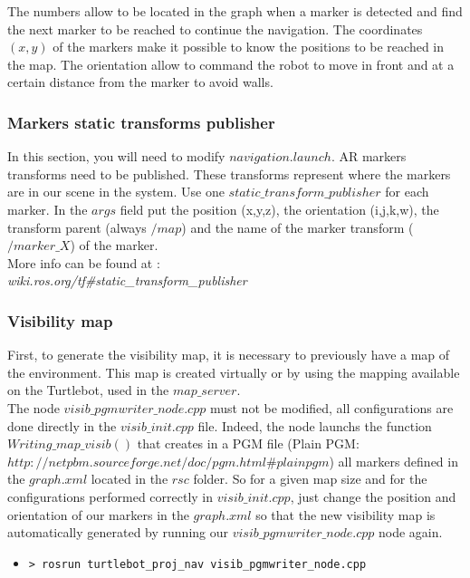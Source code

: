 \documentclass[10pt,a4paper]{article}
\begin{document}
The numbers allow to be located in the graph when a marker is detected and find the next marker to be reached to continue the navigation. The coordinates $(x,y)$ of the markers make it possible to know the positions to be reached in the map. The orientation allow to command the robot to move in front and at a certain distance from the marker to avoid walls.

\subsubsection{Markers static transforms publisher}

In this section, you will need to modify $navigation.launch$.
AR markers transforms need to be published. These transforms represent where the markers are in our scene in the system. Use one $static\_transform\_publisher$ for each marker. In the $args$ field put the position (x,y,z), the orientation (i,j,k,w), the transform parent (always $/map$) and the name of the marker transform ($/marker\_X$) of the marker.
\\More info can be found at :\\
\textit{wiki.ros.org/tf\#static\_transform\_publisher}

\subsubsection{Visibility map}

First, to generate the visibility map, it is necessary to previously have a map of the environment. This map is created virtually or by using the mapping available on the Turtlebot, used in the $ map\_server $.\\

The node $ visib\_pgmwriter\_node.cpp $ must not be modified, all configurations are done directly in the $ visib\_init.cpp $ file. Indeed, the node launchs the function $ Writing\_map\_visib() $ that creates in a PGM file (Plain PGM: $ http://netpbm.sourceforge.net/doc/pgm.html\#plainpgm $) all markers defined in the $ graph.xml $ located in the $ rsc $ folder. So for a given map size and for the configurations performed correctly in $ visib\_init.cpp $, just change the position and orientation of our markers in the $ graph.xml $ so that the new visibility map is automatically generated by running our $ visib\_pgmwriter\_node.cpp $ node again. \\

\begin{itemize}
\item[]  \begin{verbatim}> rosrun turtlebot_proj_nav visib_pgmwriter_node.cpp \end{verbatim}
\end{itemize}
\end{document}

